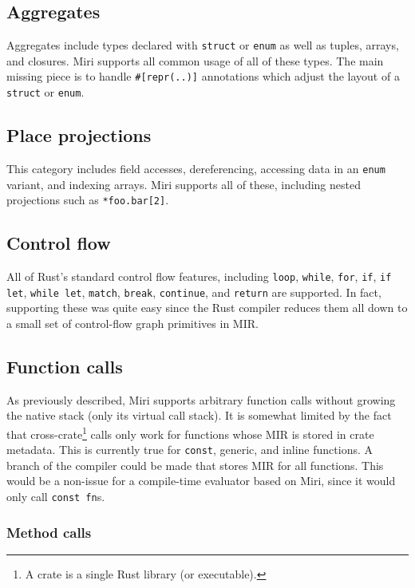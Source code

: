 \documentclass[twocolumn]{article}
\newcommand{\rust}[1]{\texttt{#1}}
\begin{document}
\subsection{Aggregates}

Aggregates include types declared with \rust{struct} or \rust{enum} as well as tuples, arrays, and
closures. Miri supports all common usage of all of these types. The main missing piece is to handle
\texttt{\#[repr(..)]} annotations which adjust the layout of a \rust{struct} or \rust{enum}.

\subsection{Place projections}

This category includes field accesses, dereferencing, accessing data in an \rust{enum} variant, and
indexing arrays. Miri supports all of these, including nested projections such as
\rust{*foo.bar[2]}.

\subsection{Control flow}

All of Rust's standard control flow features, including \rust{loop}, \rust{while}, \rust{for},
\rust{if}, \rust{if let}, \rust{while let}, \rust{match}, \rust{break}, \rust{continue}, and
\rust{return} are supported. In fact, supporting these was quite easy since the Rust compiler
reduces them all down to a small set of control-flow graph primitives in MIR.

\subsection{Function calls}

As previously described, Miri supports arbitrary function calls without growing the native stack
(only its virtual call stack). It is somewhat limited by the fact that cross-crate\footnote{A crate
is a single Rust library (or executable).} calls only work for functions whose MIR is stored in
crate metadata. This is currently true for \rust{const}, generic, and inline functions.
A branch of the compiler could be made that stores MIR for all functions. This would be a non-issue
for a compile-time evaluator based on Miri, since it would only call \rust{const fn}s.

\subsubsection{Method calls}
\end{document}
